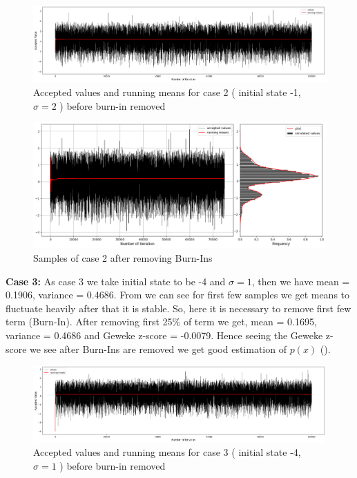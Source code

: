 \begin{example}
    \begin{figure}[H]
        \centering
        \includegraphics[width=1\textwidth]{./images/metropolis/sample-2-values.png}
        \caption{Accepted values and running means for case 2 ( initial state -1, $ \sigma = 2 $ ) before burn-in removed}
    \end{figure}

    \begin{figure}[H]
        \centering
        \includegraphics[width=1\textwidth]{./images/metropolis/sample-2-value-hist-bo.png}
        \caption{Samples of case 2 after removing Burn-Ins}
    \end{figure}

    \textbf{Case 3:} As case 3 we take initial state to be -4 and $ \sigma = 1$, then we have mean = 0.1906, variance = 0.4686. From  we can see for first few samples we get means to fluctuate heavily after that it is stable. So, here it is necessary to remove first few term (Burn-In). After removing first 25\% of term we get, mean = 0.1695, variance = 0.4686 and Geweke z-score = -0.0079. Hence seeing the Geweke z-score we see after Burn-Ins are removed we get good estimation of $ p(x) $ ().

    \begin{figure}[H]
        \centering
        \includegraphics[width=1\textwidth]{./images/metropolis/sample-3-values.png}
        \caption{Accepted values and running means for case 3 ( initial state -4, $ \sigma = 1 $ ) before burn-in removed}
        \label{fig:MH sample3}
    \end{figure}


\end{example}
